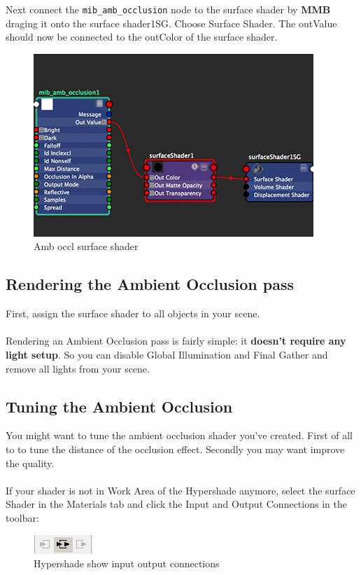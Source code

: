 \documentclass[10pt,a4paper]{article}
\begin{document}
Next connect the \lstinline{mib_amb_occlusion} node to the surface shader by \textbf{MMB} draging it onto the surface shader1SG. 
Choose Surface Shader. The outValue should now be connected to the outColor of the surface shader.

\begin{figure}[tbh]
\centering
\includegraphics[width=0.5\linewidth]{figure/Amb_occl_surface_shader}
\caption{Amb occl surface shader}
\label{fig:ambocclsurfaceshader}
\end{figure}

\subsection{Rendering the Ambient Occlusion pass}
First, assign the surface shader to all objects in your scene.
\\
\\
Rendering an Ambient Occlusion pass is fairly simple: it \textbf{doesn't require any light setup}. 
So you can disable Global Illumination and Final Gather and remove all lights from your scene.

\subsection{Tuning the Ambient Occlusion}
You might want to tune the ambient occlusion shader you've created. First of all to to tune the distance of the occlusion effect. Secondly you may want improve the quality.
\\
\\
If your shader is not in Work Area of the Hypershade anymore, select the surface Shader in the Materials tab and click the Input and Output Connections in the toolbar:
\begin{figure}[tbh]
\centering
\includegraphics[width=0.5\linewidth]{figure/Hypershade_show_input_output_connections}
\caption{Hypershade show input output connections}
\label{fig:hypershadeshowinputoutputconnections}
\end{figure}
\end{document}
